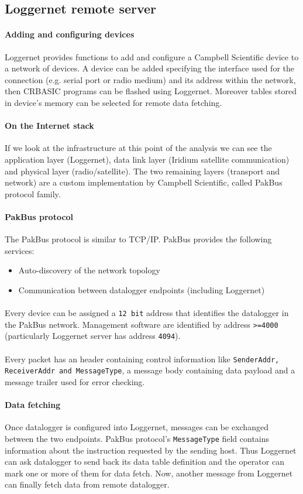 \subsection{Loggernet remote server}
\label{subsec:loggernet}
\paragraph{Adding and configuring devices}
Loggernet provides functions to add and configure a Campbell Scientific device to a network of devices. A device can be added specifying the interface used for the connection (e.g. serial port or radio medium) and its address within the network, then CRBASIC programs can be flashed using Loggernet. Moreover tables stored in device's memory can be selected for remote data fetching.
\paragraph{On the Internet stack}
If we look at the infrastructure at this point of the analysis we can see the application layer (Loggernet), data link layer (Iridium satellite communication) and physical layer (radio/satellite). The two remaining layers (transport and network) are a custom implementation by Campbell Scientific, called PakBus protocol family.
\paragraph{PakBus protocol \cite{cmp2}}
The PakBus protocol is similar to TCP/IP. PakBus provides the following services:
\begin{itemize}
    \item Auto-discovery of the network topology
    \item Communication between datalogger endpoints (including Loggernet)
\end{itemize}
\paragraph{}
Every device can be assigned a {\tt12 bit} address that identifies the datalogger in the PakBus network. Management software are identified by address {\tt >=4000} (particularly Loggernet server has address {\tt 4094}).
\paragraph{}
Every packet has an header containing control information like {\tt SenderAddr, ReceiverAddr and MessageType}, a message body containing data payload and a message trailer used for error checking.
\paragraph{Data fetching}
Once datalogger is configured into Loggernet, messages can be exchanged between the two endpoints. PakBus protocol's {\tt MessageType} field contains information about the instruction requested by the sending host. Thus Loggernet can ask datalogger to send back its data table definition and the operator can mark one or more of them for data fetch. Now, another message from Loggernet can finally fetch data from remote datalogger.